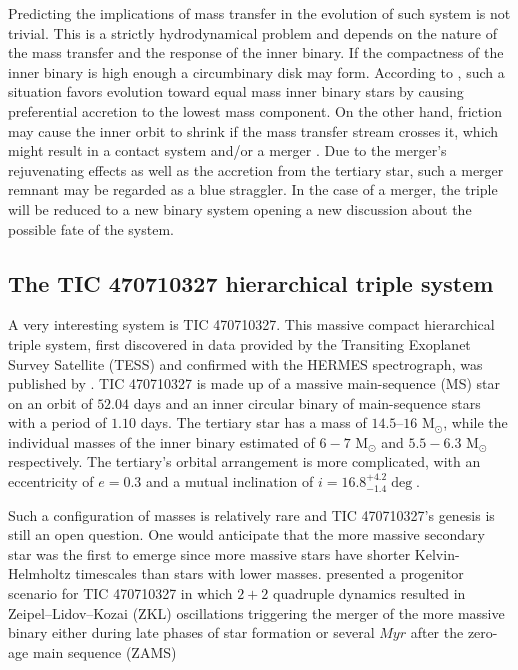 Predicting the implications of mass transfer in the evolution of such system is not trivial. This is a strictly hydrodynamical problem \citep{de2014evolution} and depends on the nature of the mass transfer and the response of the inner binary. If the compactness of the inner binary is high enough a circumbinary disk may form. According to \cite{leigh2020mergers}, such a situation favors evolution toward equal mass inner binary stars by causing preferential accretion to the lowest mass component. On the other hand, friction may cause the inner orbit to shrink if the mass transfer stream crosses it, which might result in a contact system and/or a merger \citep{de2014evolution}. Due to the merger's rejuvenating effects as well as the accretion from the tertiary star, such a merger remnant may be regarded as a blue straggler. In the case of a merger, the triple will be reduced to a new binary system opening a new discussion about the possible fate of the system.

\subsection{The TIC 470710327 hierarchical triple system}

A very interesting system is TIC 470710327. This massive compact hierarchical triple system, first discovered in data provided by the Transiting Exoplanet Survey Satellite (TESS) and confirmed with the HERMES spectrograph, was published by \cite{eisner2022planet}. TIC 470710327 is made up of a massive main-sequence (MS) star on an orbit of $52.04$ days and an inner circular binary of main-sequence stars with a period of $1.10$ days.  The tertiary star has a mass of $14.5–16$ M$_{\odot}$, while the individual masses of the inner binary estimated of $6-7$ M$_{\odot}$ and $5.5-6.3$ M$_{\odot}$ respectively. The tertiary's orbital arrangement is more complicated, with an eccentricity of $e = 0.3$ and a mutual inclination of $i = 16.8^{+4.2}_{-1.4} \deg$.

Such a configuration of masses is relatively rare \citep{de2014evolution} and TIC 470710327's genesis is still an open question. One would anticipate that the more massive secondary star was the first to emerge since more massive stars have shorter Kelvin-Helmholtz timescales than stars with lower masses. \cite{vigna2022mergers} presented a progenitor scenario for TIC 470710327 in which $2+2$ quadruple dynamics resulted in Zeipel–Lidov–Kozai (ZKL) oscillations triggering the merger of the more massive binary either during late phases of star formation or several $Myr$ after the zero-age main sequence (ZAMS)

